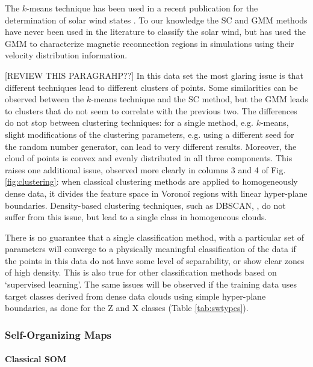 The $k$-means technique has been used in a recent publication for the determination of solar wind states \citep{Roberts2020}. To our knowledge the SC and GMM methods have never been used in the literature to classify the solar wind, but \citep{Dupuis2020} has used the GMM to characterize magnetic reconnection regions in simulations using their velocity distribution information.

[REVIEW THIS PARAGRAHP??]
In this data set the most glaring issue is that different techniques lead to different clusters of points. Some similarities can be observed between the $k$-means technique and the SC method, but the GMM leads to clusters that do not seem to correlate with the previous two. The differences do not stop between clustering techniques: for a single method, e.g. $k$-means, slight modifications of the clustering parameters, e.g. using a different seed for the random number generator, can lead to very different results. Moreover, the cloud of points is convex and evenly distributed in all three components. This raises one additional issue, observed more clearly in columns 3 and 4 of Fig.\ref{fig:clustering}: when classical clustering methods are applied to homogeneously dense data, it divides the feature space in Vorono\"i regions with linear hyper-plane boundaries. Density-based clustering techniques, such as DBSCAN, \citep{[REF newDBSCAN paper??]}, do not suffer from this issue, but lead to a single class in homogeneous clouds.

There is no guarantee that a single classification method, with a particular set of parameters will converge to a physically meaningful classification of the data if the points in this data do not have some level of separability, or show clear zones of high density. This is also true for other classification methods based on `supervised learning'. The same issues will be observed if the training data uses target classes derived from dense data clouds using simple hyper-plane boundaries, as done for the Z and X classes (Table \ref{tab:swtypes}).

\subsubsection{Self-Organizing Maps}

\paragraph{Classical SOM}

